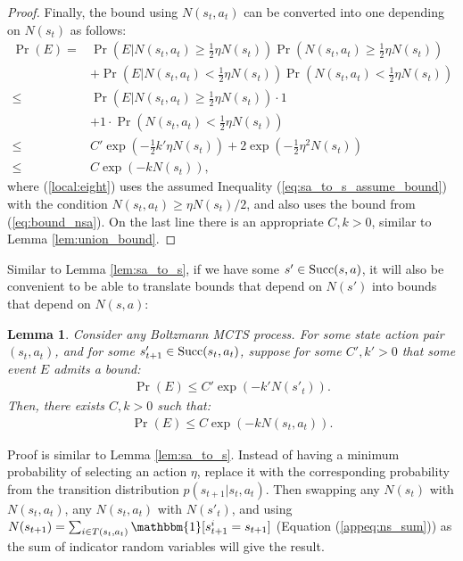 \documentclass{article}
\newcommand{\succc}[2]{\textnormal{Succ}(#1,#2)}
\newcommand{\one}{\mathbbm{1}}
\theoremstyle{plain}
\newtheorem{lemma}[theorem]{Lemma}
\newenvironment{proofoutline}{\proof[Proof outline]}{\endproof}
\begin{document}
\begin{appendices}
\begin{proof}
            Finally, the bound using $N(s_t,a_t)$ can be converted into one depending on $N(s_t)$ as follows:
            \begin{align}
                \Pr\left( E \right)
                    = & \Pr\left( E \bigg| N(s_t,a_t) \geq \frac{1}{2}\eta N(s_t)\right) 
                        \Pr\left(N(s_t,a_t) \geq \frac{1}{2}\eta N(s_t)\right) \\
                      & + \Pr\left( E \bigg| N(s_t,a_t) < \frac{1}{2}\eta N(s_t)\right) 
                        \Pr\left(N(s_t,a_t) < \frac{1}{2}\eta N(s_t)\right) \\
                    \leq & \Pr\left( E \bigg| N(s_t,a_t) \geq \frac{1}{2}\eta N(s_t)\right) 
                        \cdot 1 \\
                      & + 1 \cdot \Pr\left(N(s_t,a_t) < \frac{1}{2}\eta N(s_t)\right) \\
                    \leq & C'\exp\left(-\frac{1}{2}k'\eta N(s_t) \right) + 
                        2\exp\left(-\frac{1}{2}\eta^2N(s_t)\right) \label{local:eight} \\
                    \leq & C\exp(-k N(s_t)),
            \end{align}
            where (\ref{local:eight}) uses the assumed Inequality (\ref{eq:sa_to_s_assume_bound}) with the condition $N(s_t,a_t) \geq \eta N(s_t)/2$, and also uses the bound from (\ref{eq:bound_nsa}). On the last line there is an appropriate $C,k>0$, similar to Lemma \ref{lem:union_bound}.
        \end{proof}
    
    
    
    
    
    
        Similar to Lemma \ref{lem:sa_to_s}, if we have some $s'\in\succc{s}{a}$, it will also be convenient to be able to translate bounds that depend on $N(s')$ into bounds that depend on $N(s,a)$:
        \begin{lemma} \label{lem:s_to_sa}
            Consider any Boltzmann MCTS process. For some state action pair $(s_t,a_t)$, and for some $s'_{t+1}\in\succc{s_t}{a_t}$, suppose for some $C',k'>0$ that some event $E$ admits a bound:
            \begin{align}
                \Pr(E) \leq C'\exp(-k'N(s'_t)).
            \end{align}
            Then, there exists $C,k>0$ such that:
            \begin{align}
                \Pr(E) \leq C\exp(-k N(s_t,a_t)).
            \end{align}
        \end{lemma}
        \begin{proofoutline}
            Proof is similar to Lemma \ref{lem:sa_to_s}. Instead of having a minimum probability of selecting an action $\eta$, replace it with the corresponding probability from the transition distribution $p(s_{t+1}|s_t,a_t)$. Then swapping any $N(s_t)$ with $N(s_t,a_t)$, any $N(s_t,a_t)$ with $N(s'_t)$, and using $N(s_{t+1}) = \sum_{i\in T(s_t,a_t)} \one[s^i_{t+1} = s_{t+1}]$ (Equation (\ref{appeq:ns_sum})) as the sum of indicator random variables will give the result.
        \end{proofoutline}
    

\end{appendices}
\end{document}
